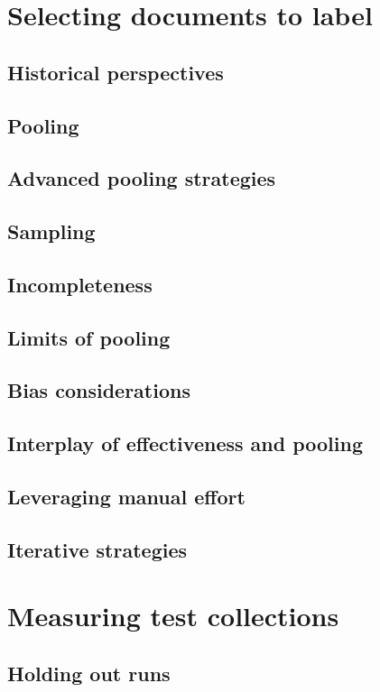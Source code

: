 \documentclass[nobib]{tufte-book}
\begin{document}
\chapter{Selecting documents to label}

\section{Historical perspectives}
\section{Pooling}
\section{Advanced pooling strategies}
\section{Sampling}
\section{Incompleteness}
\section{Limits of pooling}
\section{Bias considerations}
\section{Interplay of effectiveness and pooling}
\section{Leveraging manual effort}
\section{Iterative strategies}

\chapter{Measuring test collections} \label{measuring-test-colls}

\section{Holding out runs}
\end{document}
